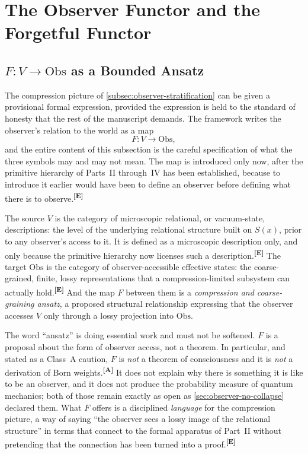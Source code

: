 \documentclass[12pt,a4paper,twoside]{article}
\theoremstyle{plain}
\theoremstyle{definition}
\theoremstyle{remark}
\newcommand{\catmark}[1]{\textsuperscript{\textsf{\textbf{[#1]}}}}
\begin{document}
\section{The Observer Functor and the Forgetful Functor}
\label{sec:observer-functor}

\subsection{\texorpdfstring{$F\colon V \to \mathrm{Obs}$}{F: V to Obs} as a Bounded Ansatz}
\label{subsec:observer-functor-ansatz}

The compression picture of \cref{subsec:observer-stratification} can be given a provisional formal expression, provided the expression is held to the standard of honesty that the rest of the manuscript demands. The framework writes the observer's relation to the world as a map
\[
 F\colon V \longrightarrow \mathrm{Obs},
\]
and the entire content of this subsection is the careful specification of what the three symbols may and may not mean. The map is introduced only now, after the primitive hierarchy of Parts~II through~IV has been established, because to introduce it earlier would have been to define an observer before defining what there is to observe.\catmark{E}

The source $V$ is the category of microscopic relational, or vacuum-state, descriptions: the level of the underlying relational structure built on $S(x)$, prior to any observer's access to it. It is defined as a microscopic description only, and only because the primitive hierarchy now licenses such a description.\catmark{E} The target $\mathrm{Obs}$ is the category of observer-accessible effective states: the coarse-grained, finite, lossy representations that a compression-limited subsystem can actually hold.\catmark{E} And the map $F$ between them is a \emph{compression and coarse-graining ansatz}, a proposed structural relationship expressing that the observer accesses $V$ only through a lossy projection into $\mathrm{Obs}$.

The word ``ansatz'' is doing essential work and must not be softened. $F$ is a proposal about the form of observer access, not a theorem. In particular, and stated as a Class~A caution, $F$ is \emph{not} a theorem of consciousness and it is \emph{not} a derivation of Born weights.\catmark{A} It does not explain why there is something it is like to be an observer, and it does not produce the probability measure of quantum mechanics; both of those remain exactly as open as \cref{sec:observer-no-collapse} declared them. What $F$ offers is a disciplined \emph{language} for the compression picture, a way of saying ``the observer sees a lossy image of the relational structure'' in terms that connect to the formal apparatus of Part~II without pretending that the connection has been turned into a proof.\catmark{E}
\end{document}

